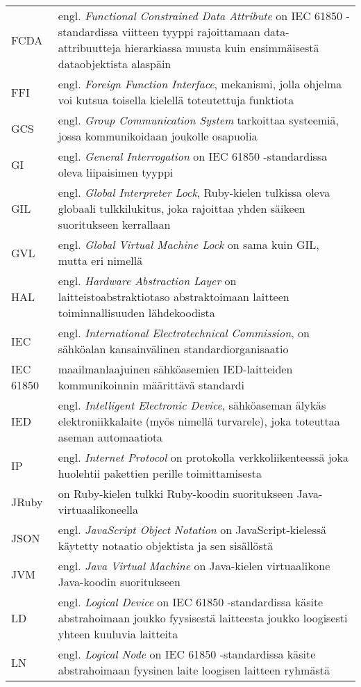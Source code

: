 \begin{tabularx}{\linewidth}[h]{@{} p{} p{} @{}}
	FCDA & engl. \emph{Functional Constrained Data Attribute} on IEC 61850 -standardissa viitteen tyyppi rajoittamaan data-attribuutteja hierarkiassa muusta kuin ensimmäisestä dataobjektista alaspäin \\
	FFI & engl. \emph{Foreign Function Interface}, mekanismi, jolla ohjelma voi kutsua toisella kielellä toteutettuja funktiota \\
	GCS & engl. \emph{Group Communication System} tarkoittaa systeemiä, jossa kommunikoidaan joukolle osapuolia \\
	GI & engl. \emph{General Interrogation} on IEC 61850 -standardissa oleva liipaisimen tyyppi \\
	GIL & engl. \emph{Global Interpreter Lock}, Ruby-kielen tulkissa oleva globaali tulkkilukitus, joka rajoittaa yhden säikeen suoritukseen kerrallaan \\
	GVL & engl. \emph{Global Virtual Machine Lock} on sama kuin GIL, mutta eri nimellä \\
	HAL & engl. \emph{Hardware Abstraction Layer} on laitteistoabstraktiotaso abstraktoimaan laitteen toiminnallisuuden lähdekoodista \\
	IEC & engl. \emph{International Electrotechnical Commission}, on sähköalan kansainvälinen standardiorganisaatio \\
	IEC 61850 & maailmanlaajuinen sähköasemien IED-laitteiden kommunikoinnin määrittävä standardi \\
	IED & engl. \emph{Intelligent Electronic Device}, sähköaseman älykäs elektroniikkalaite (myös nimellä turvarele), joka toteuttaa aseman automaatiota \\
	IP & engl. \emph{Internet Protocol} on protokolla verkkoliikenteessä joka huolehtii pakettien perille toimittamisesta \\
	JRuby & on Ruby-kielen tulkki Ruby-koodin suoritukseen Java-virtuaalikoneella \\
	JSON & engl. \emph{JavaScript Object Notation} on JavaScript-kielessä käytetty notaatio objektista ja sen sisällöstä \\
	JVM & engl. \emph{Java Virtual Machine} on Java-kielen virtuaalikone Java-koodin suoritukseen \\
	LD & engl. \emph{Logical Device} on IEC 61850 -standardissa käsite abstrahoimaan joukko fyysisestä laitteesta joukko loogisesti yhteen kuuluvia laitteita \\
	LN & engl. \emph{Logical Node} on IEC 61850 -standardissa käsite abstrahoimaan fyysinen laite loogisen laitteen ryhmästä \\

\end{tabularx}
